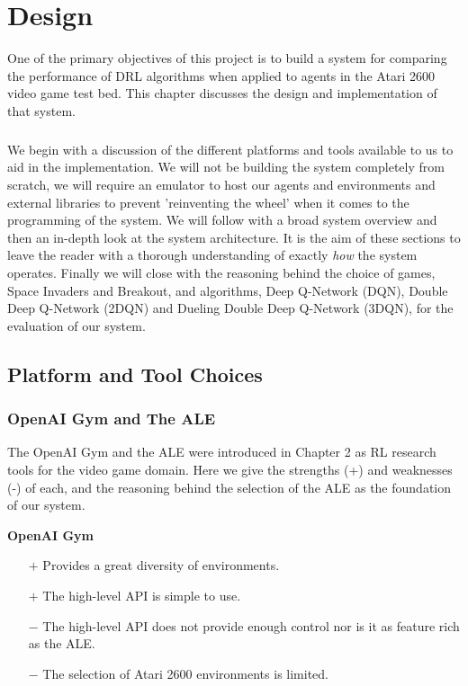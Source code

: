 \chapter{Design} \label{ch:design}
One of the primary objectives of this project is to build a system for comparing the performance of DRL algorithms when applied to agents in the Atari 2600 video game test bed. This chapter discusses the design and implementation of that system. \paragraph{}

We begin with a discussion of the different platforms and tools available to us to aid in the implementation. We will not be building the system completely from scratch, we will require an emulator to host our agents and environments and external libraries to prevent 'reinventing the wheel' when it comes to the programming of the system. We will follow with a broad system overview and then an in-depth look at the system architecture. It is the aim of these sections to leave the reader with a thorough understanding of exactly \textit{how} the system operates. Finally we will close with the reasoning behind the choice of games, Space Invaders and Breakout, and algorithms, Deep Q-Network (DQN), Double Deep Q-Network (2DQN) and Dueling Double Deep Q-Network (3DQN), for the evaluation of our system.

\section{Platform and Tool Choices}
\subsection{OpenAI Gym and The ALE}
The OpenAI Gym and the ALE were introduced in Chapter 2 as RL research tools for the video game domain. Here we give the strengths (+) and weaknesses (-) of each, and the reasoning behind the selection of the ALE as the foundation of our system.

\textbf{OpenAI Gym}
\begin{itemize}
    \item[$+$] Provides a great diversity of environments.
    \item[$+$] The high-level API is simple to use.
    \item[$-$] The high-level API does not provide enough control nor is it as feature rich as the ALE.
    \item[$-$] The selection of Atari 2600 environments is limited.
\end{itemize}

